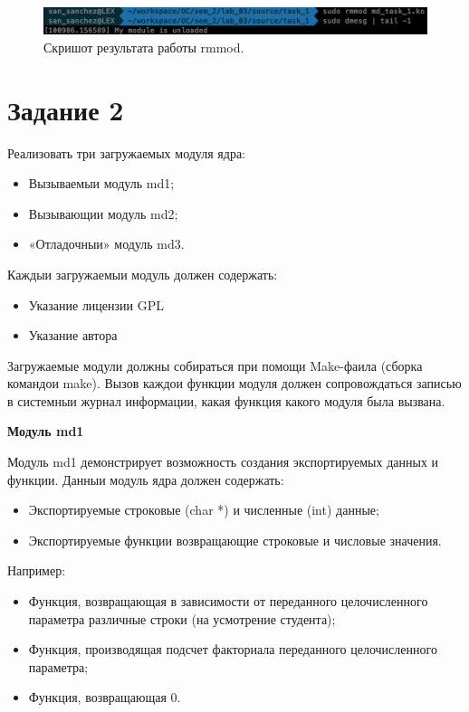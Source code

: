 \begin{figure}[H]
    \centering
    \includegraphics[scale=0.5]{data/image/task_1_4.png}
    \caption{Скришот результата работы rmmod.}
\end{figure}

\section{Задание \No{}2}

Реализовать три загружаемых модуля ядра:
\begin{itemize}
    \item Вызываемыи модуль md1;
    \item Вызывающии модуль md2;
    \item «Отладочныи» модуль md3.
\end{itemize}
Каждыи загружаемыи модуль должен содержать:
\begin{itemize}
    \item Указание лицензии GPL
    \item Указание автора
\end{itemize}
Загружаемые модули должны собираться при помощи Make-фаила (сборка командои make). Вызов каждои функции модуля должен сопровождаться записью в системныи журнал информации, какая функция какого модуля была вызвана.

\textbf{Модуль md1}

Модуль md1 демонстрирует возможность создания экспортируемых данных и функции. Данныи модуль ядра должен содержать:
\begin{itemize}
    \item Экспортируемые строковые (char *) и численные (int) данные;
    \item Экспортируемые функции возвращающие строковые и числовые значения.
\end{itemize}
Например:
\begin{itemize}
    \item Функция, возвращающая в зависимости от переданного целочисленного параметра различные строки (на усмотрение студента);
    \item Функция, производящая подсчет факториала переданного целочисленного параметра;
    \item  Функция, возвращающая 0.
\end{itemize}

